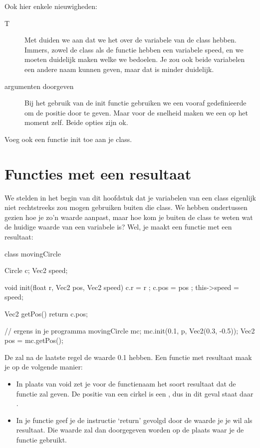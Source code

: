 Ook hier enkele nieuwigheden:
\begin{description}
\item[T] Met  duiden we aan dat we het over de variabele van de class hebben. Immers, zowel de class als de functie hebben een variabele speed, en we moeten duidelijk maken welke we bedoelen. Je zou ook beide variabelen een andere naam kunnen geven, maar dat is minder duidelijk. 
\item[argumenten doorgeven] Bij het gebruik van de init functie gebruiken we een vooraf gedefinieerde  om de positie door te geven. Maar voor de snelheid maken we een  op het moment zelf. Beide opties zijn ok.
\end{description}

\begin{exercise}
Voeg ook een functie init toe aan je class. 
\end{exercise}

\section{Functies met een resultaat}
We stelden in het begin van dit hoofdstuk dat je variabelen van een class eigenlijk niet rechtstreeks zou mogen gebruiken buiten die class. We hebben ondertussen gezien hoe je zo'n waarde aanpast, maar hoe kom je buiten de class te weten wat de huidige waarde van een variabele is? Wel, je maakt een functie met een resultaat:

\begin{code}
class movingCircle {
  Circle c;
  Vec2 speed;
  
  void init(float r, Vec2 pos, Vec2 speed) {
    c.r         = r    ;
    c.pos       = pos  ;
    this->speed = speed;
  }
  
  Vec2 getPos() {
    return c.pos;
  }
}

// ergens in je programma
movingCircle mc;
mc.init(0.1, p, Vec2(0.3, -0.5));
Vec2 pos = mc.getPos();

\end{code}

De  zal na de laatste regel de waarde 0.1 hebben. Een functie met resultaat maak je op de volgende manier:

\begin{itemize}
\item In plaats van void zet je voor de functienaam het soort resultaat dat de functie zal geven. De positie van een cirkel is een , dus in dit geval staat daar .
\item In je functie geef je de instructie `return' gevolgd door de waarde je je wil als resultaat. Die waarde zal dan doorgegeven worden op de plaats waar je de functie gebruikt.
\end{itemize}

